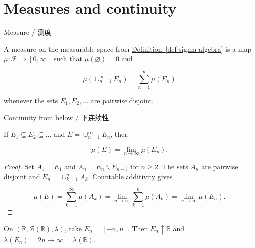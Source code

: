 \documentclass{qlnotes-export}
\begin{document}
\section{Measures and continuity}

\begin{definition}{Measure / 测度}\label{def-measure}

A measure on the measurable space from \hyperref[def-sigma-algebra]{Definition~\ref*{def-sigma-algebra}} is a map \(\mu:\mathcal{F}\Rightarrow\left\lbrack {0,\infty} \right\rbrack\) such that \(\mu(\varnothing) = 0\) and

\[\mu\left( {\cup_{n = 1}^{\infty}E_{n}} \right) = \sum\limits_{n = 1}^{\infty}\mu\left( E_{n} \right)\]

whenever the sets \(E_{1},E_{2},\ldots\) are pairwise disjoint.

\end{definition}

\begin{theorem}{Continuity from below / 下连续性}\label{thm-continuity-below}

If \(E_{1} \subseteq E_{2} \subseteq \ldots\) and \(E = \cup_{n = 1}^{\infty}E_{n}\), then

\[\mu(E) = \lim\limits_{n\rightarrow\infty}\mu\left( E_{n} \right).\]

\end{theorem}

\begin{proof}

Set \(A_{1} = E_{1}\) and \(A_{n} = E_{n} \smallsetminus E_{n - 1}\) for \(n \geq 2\). The sets \(A_{n}\) are pairwise disjoint and \(E_{n} = \cup_{k = 1}^{n}A_{k}\). Countable additivity gives

\[\mu(E) = \sum\limits_{k = 1}^{\infty}\mu\left( A_{k} \right) = \lim\limits_{n\rightarrow\infty}\sum\limits_{k = 1}^{n}\mu\left( A_{k} \right) = \lim\limits_{n\rightarrow\infty}\mu\left( E_{n} \right).\]

\end{proof}

\begin{example}

On \(\left( {{\mathbb{R}},\mathcal{B}({\mathbb{R}}),\lambda} \right)\), take \(E_{n} = \left\lbrack {- n,n} \right\rbrack\). Then \(E_{n} \uparrow {\mathbb{R}}\) and \(\lambda\left( E_{n} \right) = 2n\rightarrow\infty = \lambda({\mathbb{R}})\).

\end{example}
\end{document}
